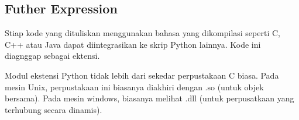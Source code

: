\documentclass{wileySix}
\begin{document}
\begin{myEnumerate}
\begin{myEnumerate}
{\begin{myEnumerate}
\chapter{Futher Expression}
\par
\vspace{14pt}
\noindent 
\hspace*{0.5in} Stiap kode yang dituliskan menggunakan bahasa yang dikompilasi seperti C, C++ atau Java dapat diintegrasikan ke skrip Python lainnya. Kode ini diagnggap sebagai ektensi. \par
\noindent 
\hspace*{0.5in} Modul ekstensi Python tidak lebih dari sekedar perpustakaan C biasa. Pada mesin Unix, perpustakaan ini biasanya diakhiri dengan .so (untuk objek bersama). Pada mesin windows, biasanya melihat .dll (untuk perpusatkaan yang terhubung secara dinamis).  \par
\vspace{12pt}
\noindent 


\end{myEnumerate}}
\end{myEnumerate}
\end{myEnumerate}
\end{document}
